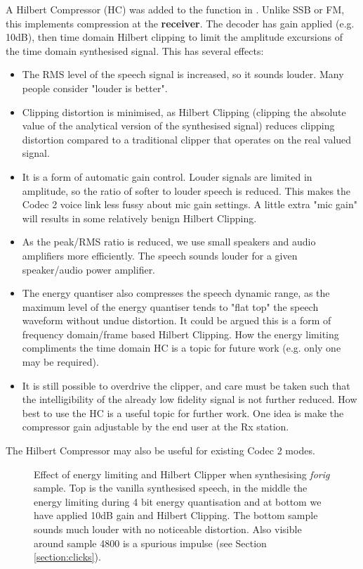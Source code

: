 \documentclass{article}
\begin{document}
A Hilbert Compressor (HC) was added to the  function in .  Unlike SSB or FM, this implements compression at the \textbf{receiver}.  The decoder has gain applied (e.g. 10dB), then time domain Hilbert clipping to limit the amplitude excursions of the time domain synthesised signal. This has several effects:
\begin{itemize}
\item The RMS level of the speech signal is increased, so it sounds louder.  Many people consider "louder is better".
\item Clipping distortion is minimised, as Hilbert Clipping (clipping the absolute value of the analytical version of the synthesised signal) reduces clipping distortion compared to a traditional clipper that operates on the real valued signal.
\item It is a form of automatic gain control. Louder signals are limited in amplitude, so the ratio of softer to louder speech is reduced. This makes the Codec 2 voice link less fussy about mic gain settings.  A little extra "mic gain" will results in some relatively benign Hilbert Clipping.
\item As the peak/RMS ratio is reduced, we use small speakers and audio amplifiers more efficiently.  The speech sounds louder for a given speaker/audio power amplifier.
\item The energy quantiser also compresses the speech dynamic range, as the maximum level of the energy quantiser tends to "flat top" the speech waveform without undue distortion.  It could be argued this is a form of frequency domain/frame based Hilbert Clipping. How the energy limiting compliments the time domain HC is a topic for future work (e.g. only one may be required).
\item It is still possible to overdrive the clipper, and care must be taken such that the intelligibility of the already low fidelity signal is not further reduced.  How best to use the HC is a useful topic for further work.  One idea is make the compressor gain adjustable by the end user at the Rx station.
\end{itemize}

The Hilbert Compressor may also be useful for existing Codec 2 modes.

\begin{figure}[h]
\caption{Effect of energy limiting and Hilbert Clipper when synthesising \emph{forig} sample. Top is the vanilla synthesised speech, in the middle the energy limiting during 4 bit energy quantisation and at bottom we have applied 10dB gain and Hilbert Clipping.  The bottom sample sounds much louder with no noticeable distortion. Also visible around sample 4800 is a spurious impulse (see Section \ref{section:clicks}).}
\label{fig:hilbert_clipper}
\begin{center}

\end{center}
\end{figure}
\end{document}
